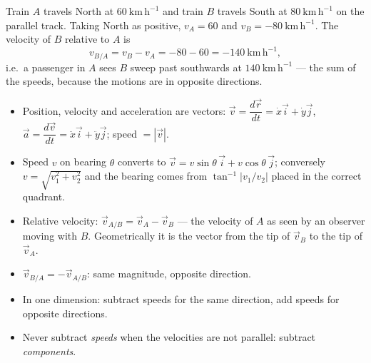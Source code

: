 \documentclass[11pt]{article}
\begin{document}
\begin{exemplebox}
Train $A$ travels North at $60\ \mathrm{km\,h^{-1}}$ and train $B$ travels South at $80\ \mathrm{km\,h^{-1}}$ on the parallel track. Taking North as positive, $v_A = 60$ and $v_B = -80\ \mathrm{km\,h^{-1}}$. The velocity of $B$ relative to $A$ is
\[
v_{B/A} = v_B - v_A = -80 - 60 = -140\ \mathrm{km\,h^{-1}},
\]
i.e.\ a passenger in $A$ sees $B$ sweep past southwards at $140\ \mathrm{km\,h^{-1}}$ — the sum of the speeds, because the motions are in opposite directions.
\end{exemplebox}

\begin{aretenir}
\begin{itemize}
\item Position, velocity and acceleration are vectors: $\vec{v} = \dfrac{d\vec{r}}{dt} = \dot{x}\vec{i} + \dot{y}\vec{j}$, $\vec{a} = \dfrac{d\vec{v}}{dt} = \ddot{x}\vec{i} + \ddot{y}\vec{j}$; speed $= |\vec{v}|$.
\item Speed $v$ on bearing $\theta$ converts to $\vec{v} = v\sin\theta\,\vec{i} + v\cos\theta\,\vec{j}$; conversely $v = \sqrt{v_1^2 + v_2^2}$ and the bearing comes from $\tan^{-1}|v_1/v_2|$ placed in the correct quadrant.
\item Relative velocity: $\vec{v}_{A/B} = \vec{v}_A - \vec{v}_B$ — the velocity of $A$ as seen by an observer moving with $B$. Geometrically it is the vector from the tip of $\vec{v}_B$ to the tip of $\vec{v}_A$.
\item $\vec{v}_{B/A} = -\vec{v}_{A/B}$: same magnitude, opposite direction.
\item In one dimension: subtract speeds for the same direction, add speeds for opposite directions.
\item Never subtract \emph{speeds} when the velocities are not parallel: subtract \emph{components}.
\end{itemize}
\end{aretenir}
\end{document}
